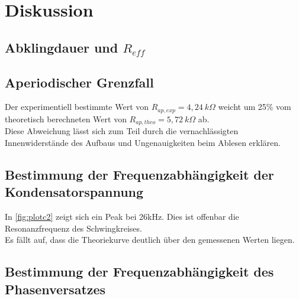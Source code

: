 \section{Diskussion}
\label{sec:Diskussion}


\subsection{Abklingdauer und $R_{eff}$}
\label{subsec:diskussion5a}

\subsection{Aperiodischer Grenzfall}
\label{subsec:diskussion5b}

Der experimentiell bestimmte Wert von $R_{ap,exp} = 4,24 \: k\Omega$ weicht um 25\% vom theoretisch berechneten Wert von 
$R_{ap,theo} = 5,72 \: k\Omega$ ab. \\
Diese Abweichung lässt sich zum Teil durch die vernachlässigten Innenwiderstände des Aufbaus und Ungenauigkeiten 
beim Ablesen erklären.\\


\subsection{Bestimmung der Frequenzabhängigkeit der Kondensatorspannung}
\label{subsec:diskussion5c}

In \autoref{fig:plotc2} zeigt sich ein Peak bei 26kHz. Dies ist offenbar die Resonanzfrequenz
des Schwingkreises. \\
Es fällt auf, dass die Theoriekurve deutlich über den gemessenen Werten liegen.\\ %



\subsection{Bestimmung der Frequenzabhängigkeit des Phasenversatzes}
\label{subsec:diskussion5d}